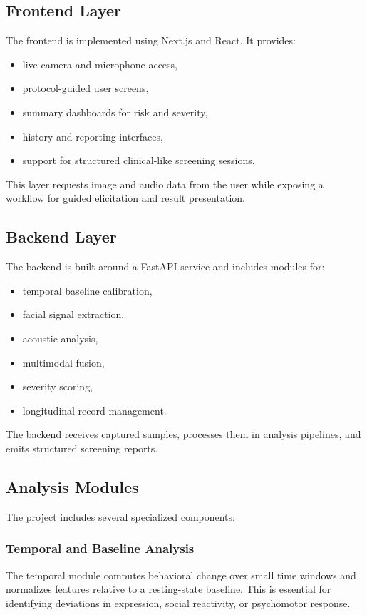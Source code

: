 \documentclass[conference, 12pt]{IEEEtran}
\begin{document}
\subsection{Frontend Layer}
The frontend is implemented using Next.js and React. It provides:
\begin{itemize}[leftmargin=1.5em]
    \item live camera and microphone access,
    \item protocol-guided user screens,
    \item summary dashboards for risk and severity,
    \item history and reporting interfaces,
    \item support for structured clinical-like screening sessions.
\end{itemize}
This layer requests image and audio data from the user while exposing a workflow for guided elicitation and result presentation.

\subsection{Backend Layer}
The backend is built around a FastAPI service and includes modules for:
\begin{itemize}[leftmargin=1.5em]
    \item temporal baseline calibration,
    \item facial signal extraction,
    \item acoustic analysis,
    \item multimodal fusion,
    \item severity scoring,
    \item longitudinal record management.
\end{itemize}
The backend receives captured samples, processes them in analysis pipelines, and emits structured screening reports.

\subsection{Analysis Modules}
The project includes several specialized components:

\subsubsection{Temporal and Baseline Analysis}
The temporal module computes behavioral change over small time windows and normalizes features relative to a resting-state baseline. This is essential for identifying deviations in expression, social reactivity, or psychomotor response.
\end{document}

